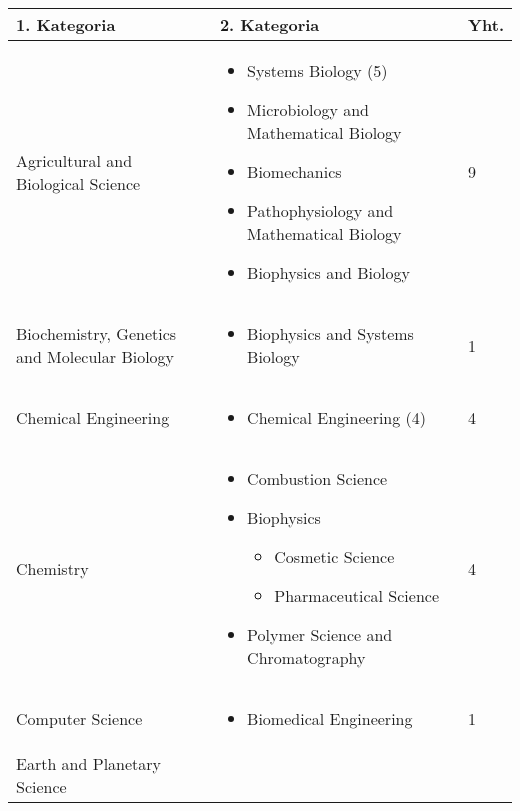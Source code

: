 \documentclass[utf8]{gradu3}
\begin{document}
\begin{longtable}[h]{|p{5cm}|p{8cm}|p{1cm}|}
    \hline
    \textbf{1. Kategoria}    & \textbf{2. Kategoria} & \textbf{Yht.} \\
    \hline
     Agricultural and Biological Science   & 
        \begin{itemize}[noitemsep,topsep=0pt]
            \item Systems Biology (5)
            \item Microbiology and Mathematical Biology
            \item Biomechanics
            \item Pathophysiology and Mathematical Biology
            \item Biophysics and Biology
        \end{itemize} & 9 \\
     \hline
     Biochemistry, Genetics and Molecular Biology & 
     \begin{itemize}[nosep]
         \item Biophysics and Systems Biology
     \end{itemize} & 1 \\
     \hline
     Chemical Engineering & 
     \begin{itemize}[nosep]
         \item Chemical Engineering (4)
     \end{itemize} & 4 \\
     \hline
     Chemistry & 
     \begin{itemize}[nosep]
        \item Combustion Science
        \item Biophysics
        \begin{itemize}[nosep]
            \item Cosmetic Science
            \item Pharmaceutical Science
        \end{itemize}
        \item Polymer Science and Chromatography
    \end{itemize} & 4 \\
     \hline
     Computer Science & \begin{itemize}[nosep]
         \item Biomedical Engineering
     \end{itemize} & 1 \\
     \hline
     Earth and Planetary Science & 
        \begin{itemize} [nosep]

\end{itemize}
\end{longtable}
\end{document}
